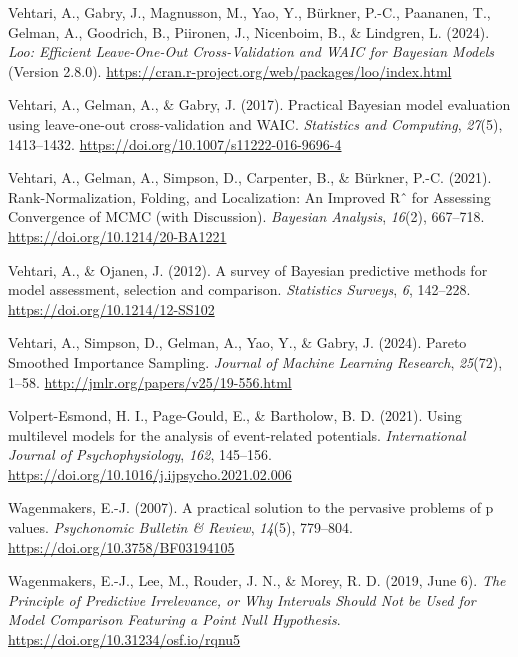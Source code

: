 \documentclass[
  doc,12pt,floatsintext]{apa7}
\newlength{\cslhangindent}
\newenvironment{CSLReferences}[2] %
 {\begin{list}{}{%
  \setlength{\itemindent}{0pt}
  \setlength{\leftmargin}{0pt}
  \setlength{\parsep}{0pt}
  \ifodd #1
   \setlength{\leftmargin}{\cslhangindent}
   \setlength{\itemindent}{-1\cslhangindent}
  \fi
  \setlength{\itemsep}{#2\baselineskip}}}
 {\end{list}}
\begin{document}
\begin{CSLReferences}{1}{0}
Vehtari, A., Gabry, J., Magnusson, M., Yao, Y., Bürkner, P.-C., Paananen, T., Gelman, A., Goodrich, B., Piironen, J., Nicenboim, B., \& Lindgren, L. (2024). \emph{Loo: {Efficient Leave-One-Out Cross-Validation} and {WAIC} for {Bayesian Models}} (Version 2.8.0). \url{https://cran.r-project.org/web/packages/loo/index.html}

Vehtari, A., Gelman, A., \& Gabry, J. (2017). Practical {Bayesian} model evaluation using leave-one-out cross-validation and {WAIC}. \emph{Statistics and Computing}, \emph{27}(5), 1413--1432. \url{https://doi.org/10.1007/s11222-016-9696-4}

Vehtari, A., Gelman, A., Simpson, D., Carpenter, B., \& Bürkner, P.-C. (2021). Rank-{Normalization}, {Folding}, and {Localization}: {An Improved Rˆ} for {Assessing Convergence} of {MCMC} (with {Discussion}). \emph{Bayesian Analysis}, \emph{16}(2), 667--718. \url{https://doi.org/10.1214/20-BA1221}

Vehtari, A., \& Ojanen, J. (2012). A survey of {Bayesian} predictive methods for model assessment, selection and comparison. \emph{Statistics Surveys}, \emph{6}, 142--228. \url{https://doi.org/10.1214/12-SS102}

Vehtari, A., Simpson, D., Gelman, A., Yao, Y., \& Gabry, J. (2024). Pareto {Smoothed Importance Sampling}. \emph{Journal of Machine Learning Research}, \emph{25}(72), 1--58. \url{http://jmlr.org/papers/v25/19-556.html}

Volpert-Esmond, H. I., Page-Gould, E., \& Bartholow, B. D. (2021). Using multilevel models for the analysis of event-related potentials. \emph{International Journal of Psychophysiology}, \emph{162}, 145--156. \url{https://doi.org/10.1016/j.ijpsycho.2021.02.006}

Wagenmakers, E.-J. (2007). A practical solution to the pervasive problems of p values. \emph{Psychonomic Bulletin \& Review}, \emph{14}(5), 779--804. \url{https://doi.org/10.3758/BF03194105}

Wagenmakers, E.-J., Lee, M., Rouder, J. N., \& Morey, R. D. (2019, June 6). \emph{The {Principle} of {Predictive Irrelevance}, or {Why Intervals Should Not} be {Used} for {Model Comparison Featuring} a {Point Null Hypothesis}}. \url{https://doi.org/10.31234/osf.io/rqnu5}


\end{CSLReferences}
\end{document}
